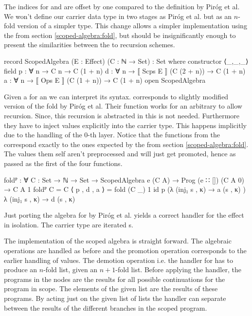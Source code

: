 The indices for  and  are offset by one compared to
the definition by Piróg et al.
We won't define our carrier data type in two stages as Piróg et al. but as an
$n$-fold version of a simpler type.
This change allows a simpler implementation using the  from
section \ref{scoped-algebra:fold}, but should be insignificantly enough to
present the similarities between the to recursion schemes.

\begin{code}
record ScopedAlgebra (E : Effect) (C : ℕ → Set) : Set where
  constructor ⟨_,_,_⟩
  field
    p : ∀ {n} → C n                      → C (1 + n)
    d : ∀ {n} → ⟦ Scps  E ⟧ (C (2 + n))  → C (1 + n)
    a : ∀ {n} → ⟦ Ops   E ⟧ (C (1 + n))  → C (1 + n)
open ScopedAlgebra
\end{code}
Given a  for an  we can
interpret its syntax.
 corresponds to slightly modified version of the fold by
Piróg et al.
Their function works for an arbitrary  to allow recursion.
Since, this recursion is abstracted in  this is not needed.
Furthermore they have to inject values explicitly into the carrier type.
This happens implicitly due to the handling of the $0$-th layer.
Notice that the functions from the  correspond
exactly to the ones expected by the  from section
\ref{scoped-algebra:fold}.
The values them self aren't preprocessed and will just get promoted, hence
 as passed as the first of the four functions.

\begin{code}
foldᴾ : ∀ {C : Set → ℕ → Set} → ScopedAlgebra e (C A) → 
  Prog (e ∷ []) (C A 0) → C A 1
foldᴾ {C = C} ⟨ p , d , a ⟩ = fold (C _) 1 id p
  (λ{ (inj₁ s , κ) → a (s , κ) }) λ{ (inj₁ s , κ) → d (s , κ) }
\end{code}
Just porting the algebra for  by Piróg et al. yields a
correct handler for the effect in isolation.
The carrier type are iterated s.

The implementation of the scoped algebra is straight forward.
The algebraic operations are handled as before and the promotion operation
corresponds to the earlier handling of values.
The demotion operation i.e. the handler for  has
to produce an $n$-fold list, given an $n+1$-fold list.
Before applying the handler, the programs in the 
nodes are the results for all possible continuations for the program in scope.
The elements of the given list are the results of these programs.
By acting just on the given list of lists the handler can separate between the
results of the different branches in the scoped program.

